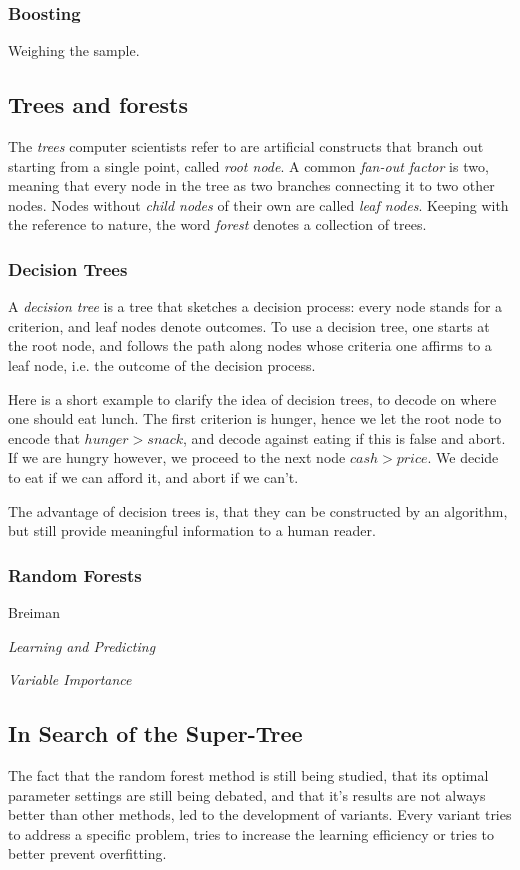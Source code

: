 \documentclass[a4paper,man,12pt,apacite]{apa6} %
\begin{document}
\subsubsection{Boosting}
Weighing the sample.

\subsection{Trees and forests}
The \emph{trees} computer scientists refer to are artificial constructs that
branch out starting from a single point, called \emph{root node}.
A common \emph{fan-out factor} is two, meaning that every node in the tree
as two branches connecting it to two other nodes.
Nodes without \emph{child nodes} of their own are called \emph{leaf nodes}.
Keeping with the reference to nature, the word \emph{forest} denotes a
collection of trees.

\subsubsection{Decision Trees}
A \emph{decision tree} is a tree that sketches a decision process: every
node stands for a criterion, and leaf nodes denote outcomes.
To use a decision tree, one starts at the root node, and follows the path
along nodes whose criteria one affirms to a leaf node, i.e. the outcome of
the decision process.

Here is a short example to clarify the idea of decision trees, to decode
on where one should eat lunch.
The first criterion is hunger, hence we let the root node to encode that
\( hunger > snack \), and decode against eating if this is false and abort.
If we are hungry however, we proceed to the next node \( cash > price \).
We decide to eat if we can afford it, and abort if we can't.

The advantage of decision trees is, that they can be constructed by an
algorithm, but still provide meaningful information to a human reader.

\subsubsection{Random Forests}
Breiman

\emph{Learning and Predicting}

\emph{Variable Importance}

\subsection{In Search of the Super-Tree}
The fact that the random forest method is still being studied, that its
optimal parameter settings are still being debated, and that it's results
are not always better than other methods, led to the development of
variants.
Every variant tries to address a specific problem, tries to increase the
learning efficiency or tries to better prevent overfitting.
\end{document}
